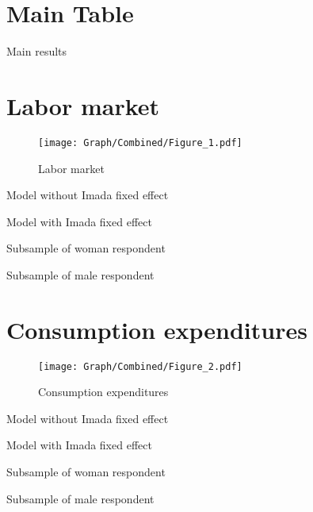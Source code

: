 \documentclass[10pt,a4paper]{article}
\begin{document}
\section{Main Table}
\begin{table}[H]\centering\caption{Main results}
\resizebox{\textwidth}{!}{}
\end{table}
\pagebreak
\section{Labor market}
\begin{table}[H]\centering

\end{table}
\begin{figure}[H]\centering
\texttt{[image: Graph/Combined/Figure\_1.pdf]}
\caption{Labor market} \label{fig:Fig_1}
\end{figure}
\begin{table}[H]\centering\caption{Model without Imada fixed effect}

\end{table}
\begin{table}[H]\centering\caption{Model with Imada fixed effect}

\end{table}
\begin{table}[H]\centering\caption{Subsample of woman respondent}

\end{table}
\begin{table}[H]\centering\caption{Subsample of male respondent}

\end{table}
\pagebreak
\section{Consumption expenditures}
\begin{table}[H]\centering

\end{table}
\begin{figure}[H]\centering
\texttt{[image: Graph/Combined/Figure\_2.pdf]}
\caption{Consumption expenditures} \label{fig:Fig_2}
\end{figure}
\begin{table}[H]\centering\caption{Model without Imada fixed effect}

\end{table}
\begin{table}[H]\centering\caption{Model with Imada fixed effect}

\end{table}
\begin{table}[H]\centering\caption{Subsample of woman respondent}

\end{table}
\begin{table}[H]\centering\caption{Subsample of male respondent}

\end{table}
\pagebreak
\end{document}
